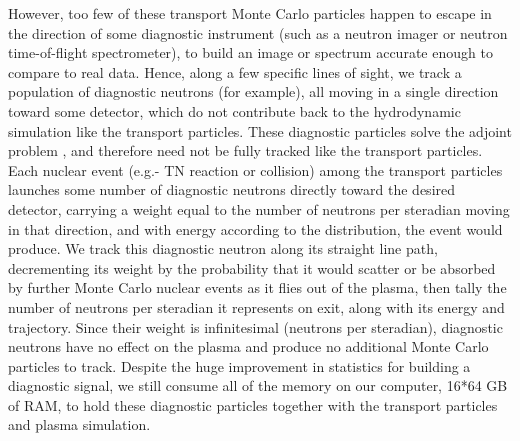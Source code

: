 \documentclass[aip,pop,numerical,reprint,floatfix]{revtex4-1}
\begin{document}
However, too few of these transport Monte Carlo particles happen to
escape in the direction of some diagnostic instrument (such as a neutron
imager or neutron time-of-flight spectrometer), to build an image
or spectrum accurate enough to compare to real data. Hence, along
a few specific lines of sight, we track a population of diagnostic
neutrons (for example), all moving in a single direction toward some
detector, which do not contribute back to the hydrodynamic simulation
like the transport particles. These diagnostic particles solve the
adjoint problem \cite{duderstadt_book}, and therefore need not be fully
tracked like the transport particles. Each nuclear event (e.g.- TN
reaction or collision) among the transport particles launches some
number of diagnostic neutrons directly toward the desired detector,
carrying a weight equal to the number of neutrons per steradian moving
in that direction, and with energy according to the distribution,
the event would produce. We track this diagnostic neutron along its
straight line path, decrementing its weight by the probability that
it would scatter or be absorbed by further Monte Carlo nuclear events
as it flies out of the plasma, then tally the number of neutrons per
steradian it represents on exit, along with its energy and trajectory.
Since their weight is infinitesimal (neutrons per steradian), diagnostic
neutrons have no effect on the plasma and produce no additional Monte
Carlo particles to track. Despite the huge improvement in statistics
for building a diagnostic signal, we still consume all of the memory
on our computer, 16{*}64 GB of RAM, to hold these diagnostic particles
together with the transport particles and plasma simulation. 
\end{document}
